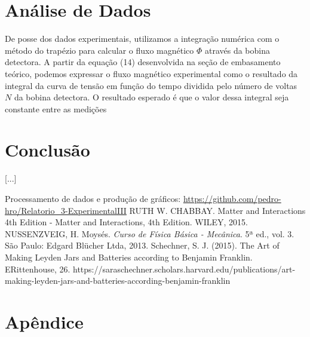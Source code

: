 \documentclass[column,brazilian,12pt,a4paper,final]{article}
\begin{document}
\section{Análise de Dados}
De posse dos dados experimentais, utilizamos a integração numérica com o método do trapézio para calcular o fluxo magnético $\Phi$ através da bobina detectora. A partir da equação (14) desenvolvida na seção de embasamento teórico, podemos expressar o fluxo magnético experimental como o resultado da integral da curva de tensão em função do tempo dividida pelo número de voltas $N$ da bobina detectora. 
O resultado esperado é que o valor dessa integral seja constante entre as medições 
\section{Conclusão}
[...]

\begin{thebibliography}{99}

\bibitem{}
Processamento de dados e produção de gráficos:
\url{https://github.com/pedro-hro/Relatorio_3-ExperimentalIII}
\bibitem{}
RUTH W. CHABBAY. Matter and Interactions 4th Edition - Matter and Interactions, 4th Edition. WILEY, 2015.
\bibitem{}
NUSSENZVEIG, H. Moysés. {\em Curso de Física Básica - Mecânica}. 5ª ed., vol. 3. São Paulo: Edgard Blücher Ltda, 2013.
\bibitem{}
Schechner, S. J. (2015). The Art of Making Leyden Jars and Batteries according to Benjamin Franklin. ERittenhouse, 26. https://saraschechner.scholars.harvard.edu/publications/art-making-leyden-jars-and-batteries-according-benjamin-franklin


\end{thebibliography}

\section*{Apêndice}
\paragraph{}

\end{document}
